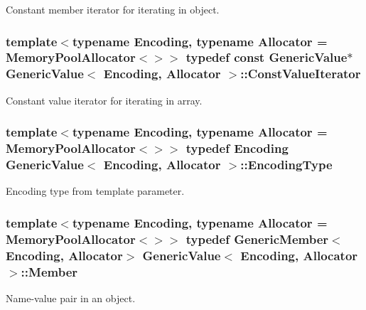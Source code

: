 Constant member iterator for iterating in object. 

\subsubsection[{\texorpdfstring{Const\+Value\+Iterator}{ConstValueIterator}}]{\setlength{\rightskip}{0pt plus 5cm}template$<$typename Encoding, typename Allocator = Memory\+Pool\+Allocator$<$$>$$>$ typedef const {\bf Generic\+Value}$\ast$ {\bf Generic\+Value}$<$ Encoding, Allocator $>$\+::{\bf Const\+Value\+Iterator}}\hypertarget{classGenericValue_a49010c6d6886f96ff0b0c51bccc7f6ea}{}\label{classGenericValue_a49010c6d6886f96ff0b0c51bccc7f6ea}


Constant value iterator for iterating in array. 

\subsubsection[{\texorpdfstring{Encoding\+Type}{EncodingType}}]{\setlength{\rightskip}{0pt plus 5cm}template$<$typename Encoding, typename Allocator = Memory\+Pool\+Allocator$<$$>$$>$ typedef Encoding {\bf Generic\+Value}$<$ Encoding, Allocator $>$\+::{\bf Encoding\+Type}}\hypertarget{classGenericValue_a28c2cb8d04d12566c1af37597a46d209}{}\label{classGenericValue_a28c2cb8d04d12566c1af37597a46d209}


Encoding type from template parameter. 

\subsubsection[{\texorpdfstring{Member}{Member}}]{\setlength{\rightskip}{0pt plus 5cm}template$<$typename Encoding, typename Allocator = Memory\+Pool\+Allocator$<$$>$$>$ typedef {\bf Generic\+Member}$<$Encoding, Allocator$>$ {\bf Generic\+Value}$<$ Encoding, Allocator $>$\+::{\bf Member}}\hypertarget{classGenericValue_a7ccf27c44058b4c11c3efc6473afb886}{}\label{classGenericValue_a7ccf27c44058b4c11c3efc6473afb886}


Name-\/value pair in an object. 

